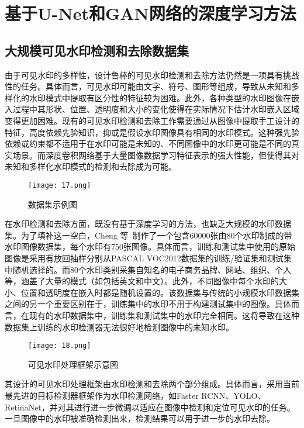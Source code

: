 \section{基于U-Net和GAN网络的深度学习方法}
\label{sec:gan}


\subsection{大规模可见水印检测和去除数据集}
由于可见水印的多样性，设计鲁棒的可见水印检测和去除方法仍然是一项具有挑战性的任务。具体而言，可见水印可能由文字、符号、图形等组成，导致从未知和多样化的水印模式中提取有区分性的特征较为困难。此外，各种类型的水印图像在嵌入过程中其形状、位置、透明度和大小的变化使得在实际情况下估计水印嵌入区域变得更加困难。现有的可见水印检测和去除工作需要通过从图像中提取手工设计的特征，高度依赖先验知识，抑或是假设水印图像具有相同的水印模式。这种强先验依赖或约束都不适用于在水印可能是未知的、不同图像中的水印更可能是不同的真实场景。而深度卷积网络基于大量图像数据学习特征表示的强大性能，但使得其对未知和多样化水印模式的检测和去除成为可能。

\begin{figure}[!htbp]
	\centering
	\texttt{[image: 17.png]}
	\caption{数据集示例图}
	\label{fig:17}
\end{figure}

在水印检测和去除方面，既没有基于深度学习的方法，也缺乏大规模的水印数据集。为了填补这一空白，Cheng 等~\cite{cheng2018large}制作了一个包含60000张由80个水印制成的带水印图像数据集，每个水印有750张图像。具体而言，训练和测试集中使用的原始图像是采用有放回抽样分别从PASCAL VOC2012数据集的训练/验证集和测试集中随机选择的。而80个水印类别采集自知名的电子商务品牌、网站、组织、个人等，涵盖了大量的模式（如包括英文和中文）。此外，不同图像中每个水印的大小、位置和透明度在嵌入时都是随机设置的。该数据集与传统的小规模水印数据集之间的另一个重要区别在于，训练集中的水印不用于构建测试集中的图像。具体而言，在现有的水印数据集中，训练集和测试集中的水印完全相同。这将导致在这种数据集上训练的水印检测器无法很好地检测图像中的未知水印。

\begin{figure*}[!htbp]
	\centering
	\texttt{[image: 18.png]}
	\caption{可见水印处理框架示意图}
	\label{fig:18}
\end{figure*}

其设计的可见水印处理框架由水印检测和去除两个部分组成。具体而言，采用当前最先进的目标检测器框架作为水印检测网络，如Faster RCNN、YOLO、RetinaNet，并对其进行进一步微调以适应在图像中检测和定位可见水印的任务。一旦图像中的水印被准确检测出来，检测结果可以用于进一步的水印去除。

